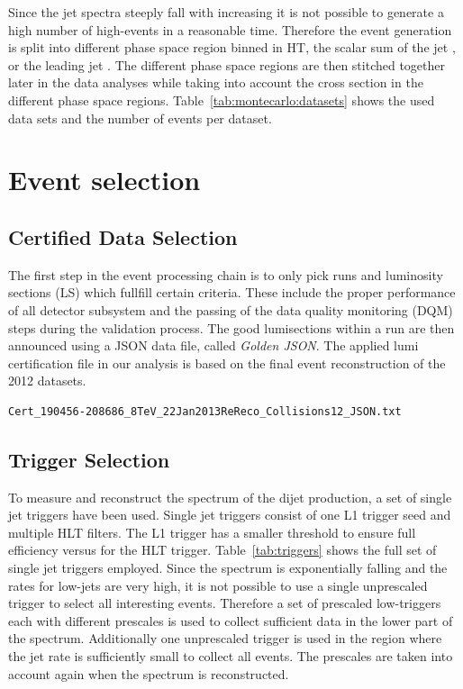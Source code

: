 Since the jet spectra steeply fall with increasing \pt it is not possible to
generate a high number of high-\pt events in a reasonable time.  Therefore the
event generation is split into different phase space region binned in HT, the
scalar sum of the jet \pt, or the leading jet \pt. The different phase space
regions are then stitched together later in the data analyses while taking into
account the cross section in the different phase space regions.
Table~\ref{tab:montecarlo:datasets} shows the used data sets and the number of
events per dataset.

\section{Event selection}

\subsection{Certified Data Selection}

The first step in the event processing chain is to only pick runs and
luminosity sections (LS) which fullfill certain criteria. These include the
proper performance of all detector subsystem and the passing of the data quality
monitoring (DQM) steps during the validation process. The good lumisections
within a run are then announced using a JSON data file, called \textit{Golden
JSON}. The applied lumi certification file in our analysis is based on the final
event reconstruction of the 2012 datasets.

\begin{verbatim}
Cert_190456-208686_8TeV_22Jan2013ReReco_Collisions12_JSON.txt
\end{verbatim}

\subsection{Trigger Selection}

To measure and reconstruct the \ptavg spectrum of the dijet production, a set of
single jet triggers have been used. Single jet triggers consist of one L1
trigger seed and multiple HLT filters. The L1 trigger has a smaller threshold to
ensure full efficiency versus \pt for the HLT trigger. Table~\ref{tab:triggers}
shows the full set of single jet triggers employed. Since the \pt spectrum is
exponentially falling and the rates for low-\pt jets are very high, it is not
possible to use a single unprescaled trigger to select all interesting events.
Therefore a set of prescaled low-\pt triggers each with different prescales is
used to collect sufficient data in the lower part of the \pt spectrum.
Additionally one unprescaled trigger is used in the region where the jet rate is
sufficiently small to collect all events. The prescales are taken into account
again when the spectrum is reconstructed. 

